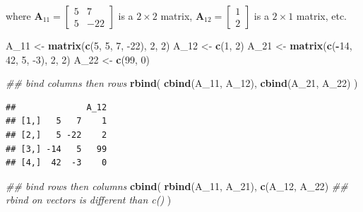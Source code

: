\documentclass[
]{book}
\newenvironment{Shaded}{\begin{snugshade}}{\end{snugshade}}
\newcommand{\CommentTok}[1]{\textcolor[rgb]{0.56,0.35,0.01}{\textit{#1}}}
\newcommand{\DecValTok}[1]{\textcolor[rgb]{0.00,0.00,0.81}{#1}}
\newcommand{\KeywordTok}[1]{\textcolor[rgb]{0.13,0.29,0.53}{\textbf{#1}}}
\newcommand{\NormalTok}[1]{#1}
\newcommand{\OperatorTok}[1]{\textcolor[rgb]{0.81,0.36,0.00}{\textbf{#1}}}
\newcommand{\StringTok}[1]{\textcolor[rgb]{0.31,0.60,0.02}{#1}}
\theoremstyle{definition}
\theoremstyle{definition}
\theoremstyle{definition}
\theoremstyle{definition}
\theoremstyle{remark}
\begin{document}
where \(\mathbf{A}_{11} = \begin{bmatrix} 5 & 7 \\ 5 & -22 \end{bmatrix}\) is a \(2 \times 2\) matrix, \(\mathbf{A}_{12} = \begin{bmatrix} 1 \\ 2 \end{bmatrix}\) is a \(2 \times 1\) matrix, etc.

\begin{Shaded}
\begin{Highlighting}[]
\NormalTok{A_}\DecValTok{11}\NormalTok{ <-}\StringTok{ }\KeywordTok{matrix}\NormalTok{(}\KeywordTok{c}\NormalTok{(}\DecValTok{5}\NormalTok{, }\DecValTok{5}\NormalTok{, }\DecValTok{7}\NormalTok{, }\DecValTok{-22}\NormalTok{), }\DecValTok{2}\NormalTok{, }\DecValTok{2}\NormalTok{)}
\NormalTok{A_}\DecValTok{12}\NormalTok{ <-}\StringTok{ }\KeywordTok{c}\NormalTok{(}\DecValTok{1}\NormalTok{, }\DecValTok{2}\NormalTok{)}
\NormalTok{A_}\DecValTok{21}\NormalTok{ <-}\StringTok{ }\KeywordTok{matrix}\NormalTok{(}\KeywordTok{c}\NormalTok{(}\OperatorTok{-}\DecValTok{14}\NormalTok{, }\DecValTok{42}\NormalTok{, }\DecValTok{5}\NormalTok{, }\DecValTok{-3}\NormalTok{), }\DecValTok{2}\NormalTok{, }\DecValTok{2}\NormalTok{)}
\NormalTok{A_}\DecValTok{22}\NormalTok{ <-}\StringTok{ }\KeywordTok{c}\NormalTok{(}\DecValTok{99}\NormalTok{, }\DecValTok{0}\NormalTok{)}

\CommentTok{## bind columns then rows}
\KeywordTok{rbind}\NormalTok{(}
    \KeywordTok{cbind}\NormalTok{(A_}\DecValTok{11}\NormalTok{, A_}\DecValTok{12}\NormalTok{),}
    \KeywordTok{cbind}\NormalTok{(A_}\DecValTok{21}\NormalTok{, A_}\DecValTok{22}\NormalTok{)}
\NormalTok{)}
\end{Highlighting}
\end{Shaded}

\begin{verbatim}
##              A_12
## [1,]   5   7    1
## [2,]   5 -22    2
## [3,] -14   5   99
## [4,]  42  -3    0
\end{verbatim}

\begin{Shaded}
\begin{Highlighting}[]
\CommentTok{## bind rows then columns}
\KeywordTok{cbind}\NormalTok{(}
    \KeywordTok{rbind}\NormalTok{(A_}\DecValTok{11}\NormalTok{, A_}\DecValTok{21}\NormalTok{),}
    \KeywordTok{c}\NormalTok{(A_}\DecValTok{12}\NormalTok{, A_}\DecValTok{22}\NormalTok{) }\CommentTok{## rbind on vectors is different than c()}
\NormalTok{)}
\end{Highlighting}
\end{Shaded}
\end{document}
